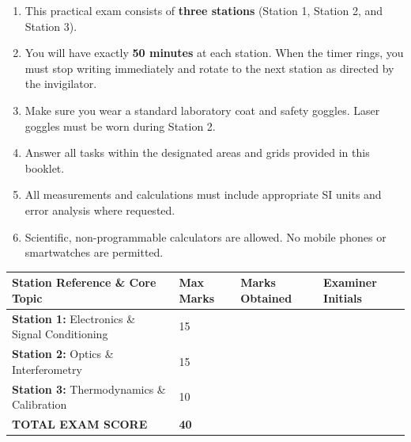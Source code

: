 \noindent
\begin{tcolorbox}[
    colback=bglight,
    colframe=secondary,
    boxrule=1.0pt,
    arc=4pt,
    title={CANDIDATE INSTRUCTIONS \& ROTATION RULES},
    fonttitle=\sffamily\bfseries\color{white},
    coltitle=white,
    colbacktitle=secondary,
    left=12pt, right=12pt, top=10pt, bottom=12pt
]
\sffamily\small
\begin{enumerate}[leftmargin=*, nosep, label=\textbf{\arabic*.}]
    \item This practical exam consists of \textbf{three stations} (Station 1, Station 2, and Station 3).
    \item You will have exactly \textbf{50 minutes} at each station. When the timer rings, you must stop writing immediately and rotate to the next station as directed by the invigilator.
    \item Make sure you wear a standard laboratory coat and safety goggles. Laser goggles must be worn during Station 2.
    \item Answer all tasks within the designated areas and grids provided in this booklet.
    \item All measurements and calculations must include appropriate SI units and error analysis where requested.
    \item Scientific, non-programmable calculators are allowed. No mobile phones or smartwatches are permitted.
\end{enumerate}
\end{tcolorbox}

\vspace{0.8cm}

\noindent
\begin{tcolorbox}[
    colback=white,
    colframe=primary!40,
    boxrule=1.0pt,
    arc=4pt,
    title={MARK ALLOCATION SUMMARY (FOR EXAMINER USE ONLY)},
    fonttitle=\sffamily\bfseries\color{primary!90!black},
    coltitle=primary!90!black,
    colbacktitle=primary!10,
    left=12pt, right=12pt, top=10pt, bottom=10pt
]
\centering\sffamily
\renewcommand{\arraystretch}{1.4}
\begin{tabularx}{\textwidth}{|X|C{2.6cm}|C{2.6cm}|C{2.8cm}|}
    \hline
    \textbf{Station Reference \& Core Topic} & \textbf{Max Marks} & \textbf{Marks Obtained} & \textbf{Examiner Initials} \\
    \hline
    \textbf{Station 1:} Electronics \& Signal Conditioning & 15 & & \\
    \hline
    \textbf{Station 2:} Optics \& Interferometry & 15 & & \\
    \hline
    \textbf{Station 3:} Thermodynamics \& Calibration & 10 & & \\
    \hline
    \textbf{TOTAL EXAM SCORE} & \textbf{40} & & \\
    \hline
\end{tabularx}
\end{tcolorbox}
